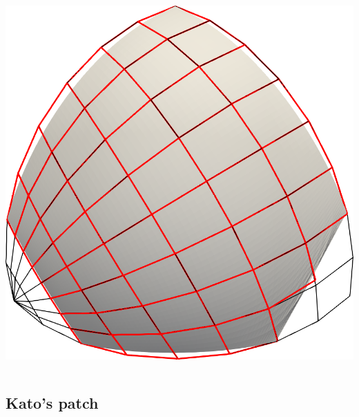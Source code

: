 \documentclass[xcolor=table]{beamer}
\begin{document}
\begin{frame}
\begin{columns}
    \vspace{1.5em}
    \includegraphics[height=.35\textheight]{images/warren-quad.png}
  \end{columns}
\end{frame}

\subsection{Kato's patch}
\end{document}
